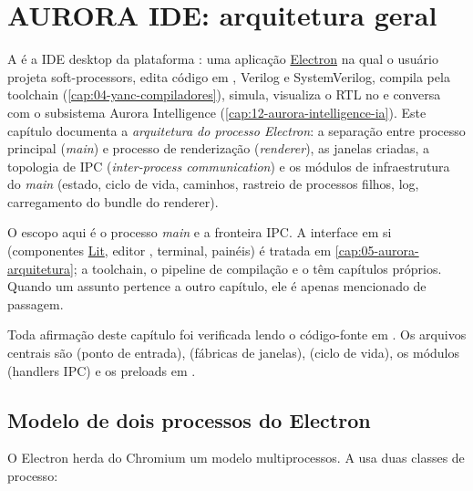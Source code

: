 \chapter{AURORA IDE: arquitetura geral}
\label{cap:05-aurora-arquitetura}

A  é a IDE desktop da plataforma : uma aplicação
\href{https://www.electronjs.org/}{Electron} na qual o usuário projeta
soft-processors, edita código em \cmm, Verilog e SystemVerilog, compila pela
toolchain  (\autoref{cap:04-yanc-compiladores}), simula, visualiza o RTL
no  e conversa com o subsistema Aurora Intelligence
(\autoref{cap:12-aurora-intelligence-ia}). Este capítulo documenta a
\emph{arquitetura do processo Electron}: a separação entre processo principal
(\emph{main}) e processo de renderização (\emph{renderer}), as janelas criadas,
a topologia de IPC (\emph{inter-process communication}) e os módulos de
infraestrutura do \emph{main} (estado, ciclo de vida, caminhos, rastreio de
processos filhos, log, carregamento do bundle do renderer).

O escopo aqui é o processo \emph{main} e a fronteira IPC. A interface em si
(componentes \href{https://lit.dev/}{Lit}, editor , terminal,
painéis) é tratada em \autoref{cap:05-aurora-arquitetura}; a toolchain, o pipeline
de compilação e o  têm capítulos próprios. Quando um assunto pertence
a outro capítulo, ele é apenas mencionado de passagem.

\begin{nota}
Toda afirmação deste capítulo foi verificada lendo o código-fonte em
. Os arquivos centrais são
 (ponto de entrada),  (fábricas de janelas),
 (ciclo de vida), os módulos 
(handlers IPC) e os preloads em .
\end{nota}

\section{Modelo de dois processos do Electron}
\label{sec:05-dois-processos}

O Electron herda do Chromium um modelo multiprocessos. A  usa duas
classes de processo:

